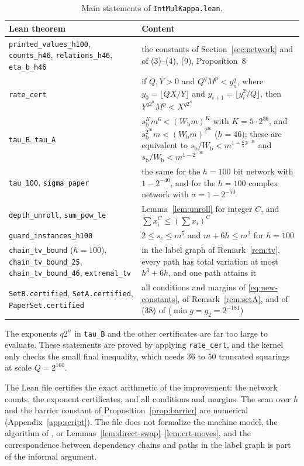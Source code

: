 \documentclass[11pt]{article}
\numberwithin{equation}{section}
\numberwithin{table}{section}
\theoremstyle{remark}
\newcommand{\OAI}{\cite{OAI}}
\newcommand{\Wb}{W_{\mathrm b}}
\newcommand{\sbb}{s_{\mathrm b}}
\newcommand{\scc}{s_{\mathrm c}}
\newcommand{\lean}[1]{\texttt{#1}}
\begin{document}
\begin{table}[ht]
\centering
\small
\begin{tabular}{@{}>{\raggedright\arraybackslash}p{.27\linewidth}>{\raggedright\arraybackslash}p{.66\linewidth}@{}}
\toprule
Lean theorem & Content\\
\midrule
\lean{printed\_values\_h100}, \lean{counts\_h46}, \lean{relations\_h46},
\lean{eta\_b\_h46} & the constants of Section~\ref{sec:network} and of
\OAI{} (3)--(4), (9), Proposition~8\\
\lean{rate\_cert} & if $Q,Y>0$ and $Q^qM^p<y_n^q$, where
$y_0=\lfloor QX/Y\rfloor$ and $y_{i+1}=\lfloor y_i^2/Q\rfloor$, then
$Y^{q2^n}M^p<X^{q2^n}$\\
\lean{tau\_B}, \lean{tau\_A} & $\sbb^{K}m^{6}<(\Wb m)^{K}$ with
$K=5\cdot2^{36}$, and $\sbb^{2^{36}}m<(\Wb m)^{2^{36}}$ ($h=46$); these
are equivalent to $\sbb/\Wb<m^{1-\frac65 2^{-36}}$ and
$\sbb/\Wb<m^{1-2^{-36}}$\\
\lean{tau\_100}, \lean{sigma\_paper} & the same for the $h=100$ bit
network with $1-2^{-40}$, and for the $h=100$ complex network with
$\sigma=1-2^{-50}$\\
\lean{depth\_unroll}, \lean{sum\_pow\_le} & Lemma~\ref{lem:unroll} for integer $C$,
and $\sum x_i^C\le(\sum x_i)^C$\\
\lean{guard\_instances\_h100} & $2\le\scc\le m^5$ and $m+6h\le m^2$ for $h=100$\\
\lean{chain\_tv\_bound} ($h=100$), \lean{chain\_tv\_bound\_25},
\lean{chain\_tv\_bound\_46}, \lean{extremal\_tv} & in the label graph of
Remark~\ref{rem:tv}, every path has total variation at most $h^3+6h$,
and one path attains it\\
\lean{SetB.certified}, \lean{SetA.certified}, \lean{PaperSet.certified}
& all conditions and margins of \eqref{eq:new-constants}, of
Remark~\ref{rem:setA}, and of (38) of \OAI{} ($\min g=g_2=2^{-181}$)\\
\bottomrule
\end{tabular}
\caption{Main statements of \lean{IntMulKappa.lean}.}
\label{tab:lean}
\end{table}

The exponents $q2^n$ in \lean{tau\_B} and the other certificates are far
too large to evaluate. These statements are proved by applying
\lean{rate\_cert}, and the kernel only checks the small final
inequality, which needs 36 to 50 truncated squarings at scale
$Q=2^{160}$.

The Lean file certifies the exact arithmetic of the improvement: the
network counts, the exponent certificates, and all conditions and
margins. The scan over $h$ and the barrier constant of
Proposition~\ref{prop:barrier} are numerical (Appendix~\ref{app:script}).
The file does not formalize the machine model, the algorithm of \OAI, or
Lemmas~\ref{lem:direct-swap}--\ref{lem:crt-moves}, and the
correspondence between dependency chains and paths in the label graph is
part of the informal argument.
\end{document}
